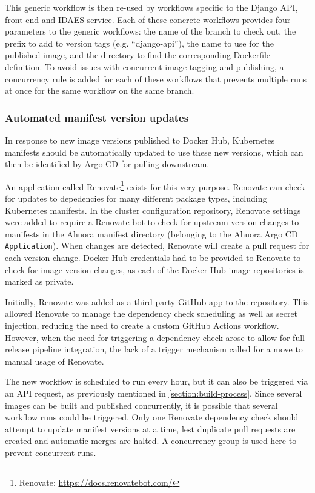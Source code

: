 This generic workflow is then re-used by workflows specific to the Django API, front-end and IDAES service. Each of these concrete workflows provides four parameters to the generic workflows: the name of the branch to check out, the prefix to add to version tags (e.g. ``django-api''), the name to use for the published image, and the directory to find the corresponding Dockerfile definition. To avoid issues with concurrent image tagging and publishing, a concurrency rule is added for each of these workflows that prevents multiple runs at once for the same workflow on the same branch.

\subsubsection{Automated manifest version updates}

In response to new image versions published to Docker Hub, Kubernetes manifests should be automatically updated to use these new versions, which can then be identified by Argo CD for pulling downstream.

An application called Renovate\footnote{Renovate: \url{https://docs.renovatebot.com/}} exists for this very purpose. Renovate can check for updates to depedencies for many different package types, including Kubernetes manifests. In the cluster configuration repository, Renovate settings were added to require a Renovate bot to check for upstream version changes to manifests in the Ahuora manifest directory (belonging to the Ahuora Argo CD \verb|Application|). When changes are detected, Renovate will create a pull request  for each version change. Docker Hub credentials had to be provided to Renovate to check for image version changes, as each of the Docker Hub image repositories is marked as private.

Initially, Renovate was added as a third-party GitHub app to the repository. This allowed Renovate to manage the dependency check scheduling as well as secret injection, reducing the need to create a custom GitHub Actions workflow. However, when the need for triggering a dependency check arose to allow for full release pipeline integration, the lack of a trigger mechanism called for a move to manual usage of Renovate.

The new workflow is scheduled to run every hour, but it can also be triggered via an API request, as previously mentioned in \ref{section:build-process}. Since several images can be built and published concurrently, it is possible that several workflow runs could be triggered. Only one Renovate dependency check should attempt to update manifest versions at a time, lest duplicate pull requests are created and automatic merges are halted. A concurrency group is used here to prevent concurrent runs.


